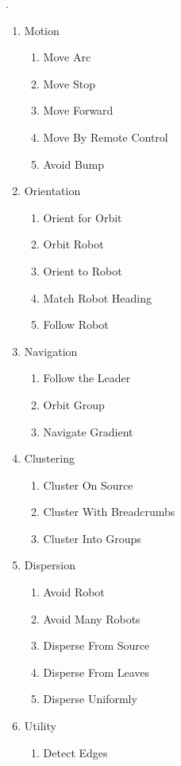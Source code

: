 \documentclass[]{article}
\begin{document}
\cite{mclurkin2004stupid}.
\begin{multicols}{2}
	\begin{enumerate}[noitemsep]
	\item Motion
		\begin{enumerate}[noitemsep]
		\item Move Arc
		\item Move Stop
		\item Move Forward
		\item Move By Remote Control
		\item Avoid Bump
		\end{enumerate}
	\item Orientation
		\begin{enumerate}[noitemsep]
		\item Orient for Orbit
		\item Orbit Robot
		\item Orient to Robot
		\item Match Robot Heading
		\item Follow Robot
		\end{enumerate}
	\item Navigation
		\begin{enumerate}[noitemsep]
		\item Follow the Leader
		\item Orbit Group
		\item Navigate Gradient
		\end{enumerate}
	\item Clustering
		\begin{enumerate}[noitemsep]
		\item Cluster On Source
		\item Cluster With Breadcrumbs
		\item Cluster Into Groups
		\end{enumerate}
	\item Dispersion
		\begin{enumerate}[noitemsep]
		\item Avoid Robot
		\item Avoid Many Robots
		\item Disperse From Source
		\item Disperse From Leaves
		\item Disperse Uniformly
		\end{enumerate}
	\item Utility
		\begin{enumerate}[noitemsep]
		\item Detect Edges
		\end{enumerate}
	\end{enumerate}
\end{multicols} 
\end{document}

